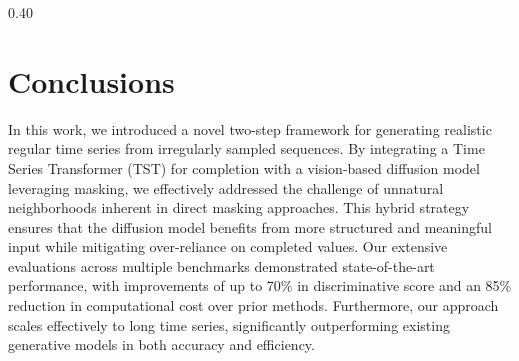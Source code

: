 \documentclass{article}
\theoremstyle{plain}
\theoremstyle{definition}
\theoremstyle{remark}
\begin{document}
\begin{table}[t]
\begin{subtable}[t]{0.40\linewidth}
        \label{tab:ablation_50_combined}
    \end{subtable}
    \vspace{-3mm}
\end{table}


\vspace{-3mm}
\section{Conclusions}
\vspace{-2mm}


In this work, we introduced a novel two-step framework for generating realistic regular time series from irregularly sampled sequences. By integrating a Time Series Transformer (TST) for completion with a vision-based diffusion model leveraging masking, we effectively addressed the challenge of unnatural neighborhoods inherent in direct masking approaches. This hybrid strategy ensures that the diffusion model benefits from more structured and meaningful input while mitigating over-reliance on completed values. Our extensive evaluations across multiple benchmarks demonstrated state-of-the-art performance, with improvements of up to 70\% in discriminative score and an 85\% reduction in computational cost over prior methods. Furthermore, our approach scales effectively to long time series, significantly outperforming existing generative models in both accuracy and efficiency.
\end{document}
